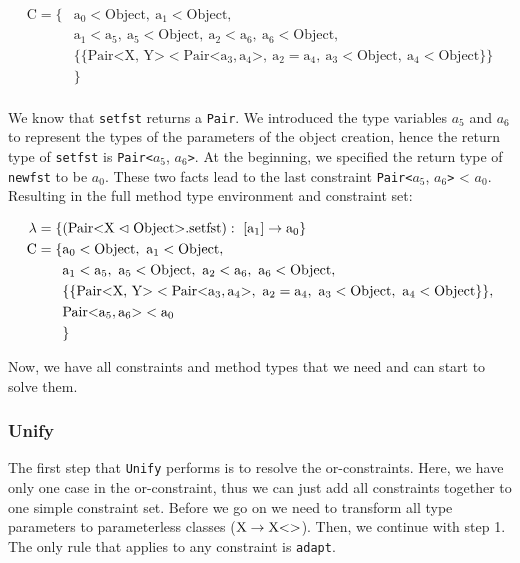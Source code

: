 \begin{align*}
    \text{C} = \{& \text{a}_0 < \text{Object}, \ \text{a}_1 < \text{Object}, \\
    &\text{a}_1 < \text{a}_5, \ \text{a}_5 < \text{Object}, \ \text{a}_2 < \text{a}_6, \ \text{a}_6 < \text{Object}, \\
    & \{ \{ \text{Pair<X, Y>} < \text{Pair<} \text{a}_3, \text{a}_4 \text{>}, \ \text{a}_2 = \text{a}_4, \ \text{a}_3 < \text{Object}, \ \text{a}_4 < \text{Object} \} \} \\
    &\}\\
\end{align*}

We know that \verb|setfst| returns a \verb|Pair|. We introduced the type variables $a_5$ and $a_6$ to represent the types of the parameters of the object creation, hence the return type of \verb|setfst| is \verb|Pair<|$a_5$, $a_6$\verb|>|.
At the beginning, we specified the return type of \verb|newfst| to be $a_0$. These two facts lead to the last constraint \verb|Pair<|$a_5$, $a_6$\verb|>| < $a_0$.
Resulting in the full method type environment and constraint set:

\begin{align*}
    \lambda = \{& ( \cxnm{Pair}{X}{Object}{setfst} ): \ [\text{a}_1] \to \text{a}_0 \}\\
    \text{C} = \{& \text{a}_0 < \text{Object}, \ \text{a}_1 < \text{Object}, \\
    &\text{a}_1 < \text{a}_5, \ \text{a}_5 < \text{Object}, \ \text{a}_2 < \text{a}_6, \ \text{a}_6 < \text{Object}, \\
    & \{ \{ \text{Pair<X, Y>} < \text{Pair<} \text{a}_3, \text{a}_4 \text{>}, \ \text{a}_2 = \text{a}_4, \ \text{a}_3 < \text{Object}, \ \text{a}_4 < \text{Object} \} \},\\
    &\text{Pair<}\text{a}_5, \text{a}_6\text{>} < \text{a}_0\\
    &\}\\
\end{align*}

Now, we have all constraints and method types that we need and can start to solve them.

\subsubsection{Unify}
The first step that \verb|Unify| performs is to resolve the or-constraints. Here, we have only one case in the or-constraint, thus we can just add all constraints together to one simple constraint set.
Before we go on we need to transform all type parameters to parameterless classes ($\text{X} \to \text{X} \text{<}  \text{>}$).
Then, we continue with step 1. The only rule that applies to any constraint is \verb|adapt|.

